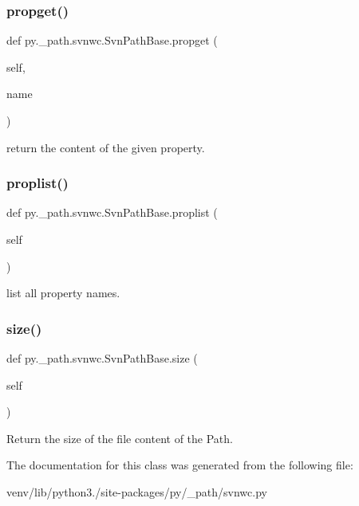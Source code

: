\subsubsection{\texorpdfstring{propget()}{propget()}}
{\footnotesize\ttfamily def py.\+\_\+path.\+svnwc.\+Svn\+Path\+Base.\+propget (\begin{DoxyParamCaption}\item[{}]{self,  }\item[{}]{name }\end{DoxyParamCaption})}

\begin{DoxyVerb}return the content of the given property. \end{DoxyVerb}
 \mbox{\label{classpy_1_1__path_1_1svnwc_1_1_svn_path_base_a7f955b675b63298b8e6c3018fcc4055a}} 
\subsubsection{\texorpdfstring{proplist()}{proplist()}}
{\footnotesize\ttfamily def py.\+\_\+path.\+svnwc.\+Svn\+Path\+Base.\+proplist (\begin{DoxyParamCaption}\item[{}]{self }\end{DoxyParamCaption})}

\begin{DoxyVerb}list all property names. \end{DoxyVerb}
 \mbox{\label{classpy_1_1__path_1_1svnwc_1_1_svn_path_base_ae3f13d3f270d7283cf56916b2ccd1872}} 
\subsubsection{\texorpdfstring{size()}{size()}}
{\footnotesize\ttfamily def py.\+\_\+path.\+svnwc.\+Svn\+Path\+Base.\+size (\begin{DoxyParamCaption}\item[{}]{self }\end{DoxyParamCaption})}

\begin{DoxyVerb}Return the size of the file content of the Path. \end{DoxyVerb}
 

The documentation for this class was generated from the following file\+:\begin{DoxyCompactItemize}
\item 
venv/lib/python3./site-\/packages/py/\+\_\+path/svnwc.\+py\end{DoxyCompactItemize}
